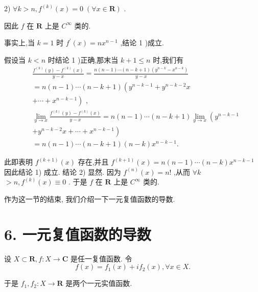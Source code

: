 2) $\forall k > n,{f}^{\left( k\right) }\left( x\right)  = 0\;\left( {\forall x \in  \mathbf{R}}\right)$ .

因此 $f$ 在 $\mathbf{R}$ 上是 ${C}^{\infty }$ 类的.

事实上,当 $k = 1$ 时 ${f}^{\prime }\left( x\right)  = n{x}^{n - 1}$ ,结论 1 )成立.

假设当 $k < n$ 时结论 1 )正确,那末当 $k + 1 \leq  n$ 时,我们有
\begin{align*}
	&\frac{{f}^{\left( k\right) }\left( y\right)  - {f}^{\left( k\right) }\left( x\right) }{y - x} = \frac{n\left( {n - 1}\right) \cdots \left( {n - k + 1}\right) \left( {{y}^{n - k} - {x}^{n - k}}\right) }{y - x}\\
	&= n\left( {n - 1}\right) \cdots \left( {n - k + 1}\right) \left( {{y}^{n - k - 1} + {y}^{n - k - 2}x}\right.\\
	&\left. {+\cdots  + {x}^{n - k - 1}}\right) \text{ , }\\
	&\mathop{\lim }\limits_{{y \rightarrow  x}}\frac{{f}^{\left( k\right) }\left( y\right)  - {f}^{\left( k\right) }\left( x\right) }{y - x} = n\left( {n - 1}\right) \cdots \left( {n - k + 1}\right) \mathop{\lim }\limits_{{y \rightarrow  x}}\left( {y}^{n - k - 1}\right.\\
	&\left. {+{y}^{n - k - 2}x + \cdots  + {x}^{n - k - 1}}\right)\\
	&= n\left( {n - 1}\right) \cdots \left( {n - k + 1}\right) \left( {n - k}\right) {x}^{n - k - 1}.
\end{align*}

此即表明 ${f}^{\left( k + 1\right) }\left( x\right)$ 存在,并且 ${f}^{\left( k + 1\right) }\left( x\right)  = n\left( {n - 1}\right) \cdots \left( {n - k}\right) {x}^{n - k - 1}$ 因此结论 1) 成立. 结论 2) 显然. 因为 ${f}^{\left( n\right) }\left( x\right)  = n!$ ,从而 $\forall k$  $> n,{f}^{\left( k\right) }\left( x\right)  \equiv  0$ . 于是 $f$ 在 $\mathbf{R}$ 上是 ${C}^{\infty }$ 类的.

作为这一节的结束, 我们介绍一下一元复值函数的导数.

\section*{6. 一元复值函数的导数}

设 $X \subset  \mathbf{R},f : X \rightarrow  \mathbf{C}$ 是任一复值函数. 令
$$f\left( x\right)  = {f}_{1}\left( x\right)  + i{f}_{2}\left( x\right) ,\forall x \in  X.$$

于是 ${f}_{1},{f}_{2} : X \rightarrow  \mathbf{R}$ 是两个一元实值函数.

